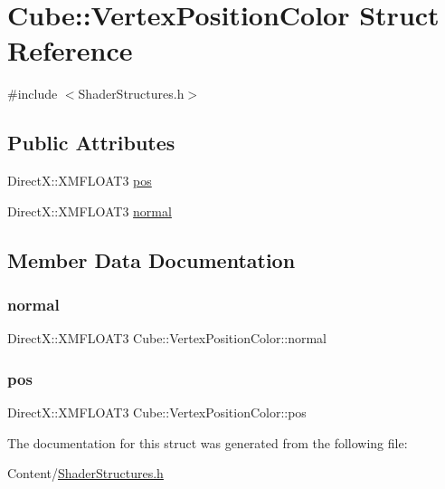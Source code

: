 \hypertarget{struct_cube_1_1_vertex_position_color}{}\section{Cube\+:\+:Vertex\+Position\+Color Struct Reference}
\label{struct_cube_1_1_vertex_position_color}


{\ttfamily \#include $<$Shader\+Structures.\+h$>$}

\subsection*{Public Attributes}
\begin{DoxyCompactItemize}
\item 
Direct\+X\+::\+X\+M\+F\+L\+O\+A\+T3 \hyperlink{struct_cube_1_1_vertex_position_color_a39315affdd120bca4aa0c38d0d354427}{pos}
\item 
Direct\+X\+::\+X\+M\+F\+L\+O\+A\+T3 \hyperlink{struct_cube_1_1_vertex_position_color_aaeb8e604e74dbf92a7becaa154557a0a}{normal}
\end{DoxyCompactItemize}


\subsection{Member Data Documentation}
\mbox{\label{struct_cube_1_1_vertex_position_color_aaeb8e604e74dbf92a7becaa154557a0a}} 
\subsubsection{\texorpdfstring{normal}{normal}}
{\footnotesize\ttfamily Direct\+X\+::\+X\+M\+F\+L\+O\+A\+T3 Cube\+::\+Vertex\+Position\+Color\+::normal}

\mbox{\label{struct_cube_1_1_vertex_position_color_a39315affdd120bca4aa0c38d0d354427}} 
\subsubsection{\texorpdfstring{pos}{pos}}
{\footnotesize\ttfamily Direct\+X\+::\+X\+M\+F\+L\+O\+A\+T3 Cube\+::\+Vertex\+Position\+Color\+::pos}



The documentation for this struct was generated from the following file\+:\begin{DoxyCompactItemize}
\item 
Content/\hyperlink{_shader_structures_8h}{Shader\+Structures.\+h}\end{DoxyCompactItemize}
